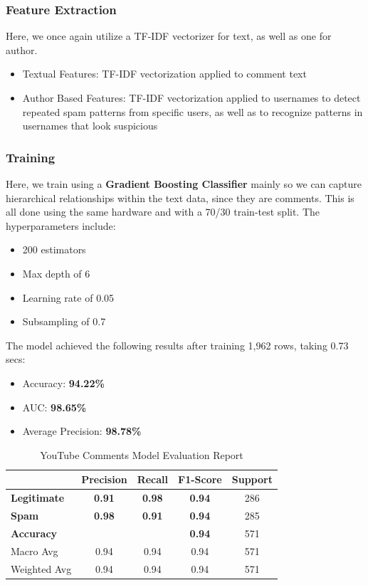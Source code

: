 \documentclass{article}
\begin{document}
\subsubsection*{Feature Extraction}

Here, we once again utilize a TF-IDF vectorizer for text, as well as one for author.

\begin{itemize}
    \item Textual Features: TF-IDF vectorization applied to comment text
    \item Author Based Features: TF-IDF vectorization applied to usernames to detect repeated spam patterns from specific users, as well as to recognize patterns in usernames that look suspicious
\end{itemize}

\subsubsection*{Training}

Here, we train using a \textbf{Gradient Boosting Classifier} mainly so we can capture hierarchical relationships within the text data, since they are comments. This is all done using the same hardware and with a 70/30 train-test split. The hyperparameters include:

\begin{itemize}
    \item 200 estimators
    \item Max depth of 6
    \item Learning rate of 0.05
    \item Subsampling of 0.7
\end{itemize}

\noindent
The model achieved the following results after training 1,962 rows, taking 0.73 secs:

\begin{itemize}
    \item Accuracy: \textbf{94.22\%}
    \item AUC: \textbf{98.65\%}
    \item Average Precision: \textbf{98.78\%}
\end{itemize}

\begin{table}[htbp]
    \centering
    \caption{YouTube Comments Model Evaluation Report}
    \begin{tabular}{l c c c c}
    \toprule
     & \textbf{Precision} & \textbf{Recall} & \textbf{F1-Score} & Support \\
    \midrule
    \textbf{Legitimate} & \textbf{0.91} & \textbf{0.98} & \textbf{0.94} & 286 \\
    \textbf{Spam} & \textbf{0.98} & \textbf{0.91} & \textbf{0.94} & 285 \\
    \midrule
    \textbf{Accuracy}  & & & \textbf{0.94} & 571 \\
    Macro Avg & 0.94 & 0.94 & 0.94 & 571 \\
    Weighted Avg & 0.94 & 0.94 & 0.94 & 571 \\
    \bottomrule
    \end{tabular}
    \label{tab:gbm_evaluation}
\end{table}
\end{document}

